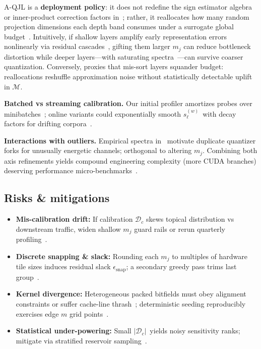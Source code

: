 \documentclass[conference]{IEEEtran}
\begin{document}
A-QJL is a \textbf{deployment policy}: it does not redefine the sign estimator algebra or inner-product correction factors in~\cite{zandieh2024qjl}; rather, it reallocates how many random projection dimensions each depth band consumes under a surrogate global budget~\cite{presentation_mqjl}. Intuitively, if shallow layers amplify early representation errors nonlinearly via residual cascades~\cite{lipschitz2024}, gifting them larger \(m_j\) can reduce bottleneck distortion while deeper layers—with saturating spectra~\cite{rudelson2014}---can survive coarser quantization. Conversely, proxies that mis-sort layers squander budget: reallocations reshuffle approximation noise without statistically detectable uplift in \(\mathcal{M}\).

\textbf{Batched vs streaming calibration.} Our initial profiler amortizes probes over minibatches~\cite{presentation_mqjl}; online variants could exponentially smooth \(s_{\ell}^{(w)}\)\ with decay factors for drifting corpora~\cite{presentation_mqjl}.

\textbf{Interactions with outliers.}
Empirical spectra in~\cite{zandieh2024qjl} motivate duplicate quantizer forks for unusually energetic channels; orthogonal to altering \(m_j\). Combining both axis refinements yields compound engineering complexity (more CUDA branches) deserving performance micro-benchmarks~\cite{presentation_mqjl}.

\subsection{Risks \& mitigations}

\begin{itemize}
\item \textbf{Mis-calibration drift:} If calibration \(\mathcal{D}_c\) skews topical distribution vs downstream traffic, widen shallow \(m_j\) guard rails or rerun quarterly profiling~\cite{presentation_mqjl}.
\item \textbf{Discrete snapping \& slack:} Rounding each \(m_j\) to multiples of hardware tile sizes induces residual slack \(\epsilon_{\mathrm{snap}}\); a secondary greedy pass trims last group~\cite{kivi2024,zandieh2024aqjl-repo}.
\item \textbf{Kernel divergence:} Heterogeneous packed bitfields must obey alignment constraints or suffer cache-line thrash~\cite{zandieh2024qjl}; deterministic seeding reproducibly exercises edge \(m\) grid points~\cite{qjlkernel}.
\item \textbf{Statistical under-powering:} Small \(|\mathcal{D}_c|\)\ yields noisy sensitivity ranks; mitigate via stratified reservoir sampling~\cite{presentation_mqjl}.
\end{itemize}
\end{document}
